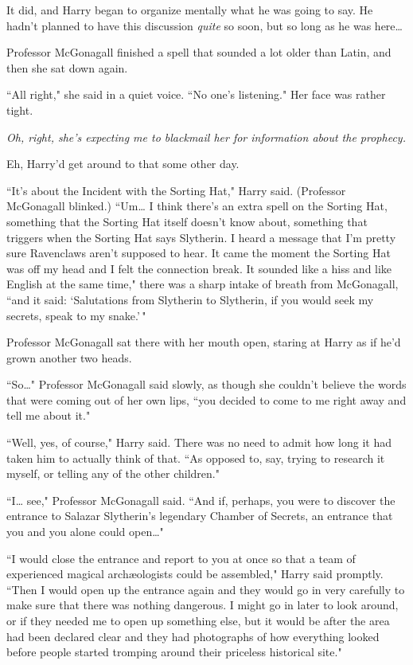 It did, and Harry began to organize mentally what he was going to say. He hadn't planned to have this discussion \emph{quite} so soon, but so long as he was here{\ldots}

Professor McGonagall finished a spell that sounded a lot older than Latin, and then she sat down again.

``All right," she said in a quiet voice. ``No one's listening." Her face was rather tight.

\emph{Oh, right, she's expecting me to blackmail her for information about the prophecy.}

Eh, Harry'd get around to that some other day.

``It's about the Incident with the Sorting Hat," Harry said. (Professor McGonagall blinked.) ``Um{\ldots} I think there's an extra spell on the Sorting Hat, something that the Sorting Hat itself doesn't know about, something that triggers when the Sorting Hat says Slytherin. I heard a message that I'm pretty sure Ravenclaws aren't supposed to hear. It came the moment the Sorting Hat was off my head and I felt the connection break. It sounded like a hiss and like English at the same time," there was a sharp intake of breath from McGonagall, ``and it said: `Salutations from Slytherin to Slytherin, if you would seek my secrets, speak to my snake.'\,"

Professor McGonagall sat there with her mouth open, staring at Harry as if he'd grown another two heads.

``So{\ldots}" Professor McGonagall said slowly, as though she couldn't believe the words that were coming out of her own lips, ``you decided to come to me right away and tell me about it."

``Well, yes, of course," Harry said. There was no need to admit how long it had taken him to actually think of that. ``As opposed to, say, trying to research it myself, or telling any of the other children."

``I{\ldots} see," Professor McGonagall said. ``And if, perhaps, you were to discover the entrance to Salazar Slytherin's legendary Chamber of Secrets, an entrance that you and you alone could open{\ldots}"

``I would close the entrance and report to you at once so that a team of experienced magical archæologists could be assembled," Harry said promptly. ``Then I would open up the entrance again and they would go in very carefully to make sure that there was nothing dangerous. I might go in later to look around, or if they needed me to open up something else, but it would be after the area had been declared clear and they had photographs of how everything looked before people started tromping around their priceless historical site."

